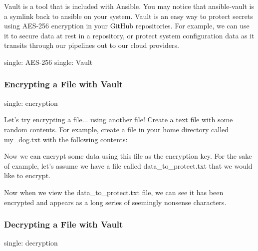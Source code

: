 Vault is a tool that is included with Ansible. You may notice that
ansible-vault is a symlink back to ansible on your system. Vault is an
easy way to protect secrets using AES-256 encryption in your GitHub
repositories. For example, we can use it to secure data at rest in a
repository, or protect system configuration data as it transits through
our pipelines out to our cloud providers.

single: AES-256 single: Vault

\hypertarget{encrypting-a-file-with-vault}{%
   \subsubsection{Encrypting a File with
      Vault}\label{encrypting-a-file-with-vault}}

single: encryption

Let's try encrypting a file... using another file! Create a text file
with some random contents. For example, create a file in your home
directory called my\_dog.txt with the following contents:

\begin{Shaded}
   \begin{Highlighting}[]
   \end{Highlighting}
\end{Shaded}

Now we can encrypt some data using this file as the encryption key. For
the sake of example, let's assume we have a file called
data\_to\_protect.txt that we would like to encrypt.

\begin{Shaded}
   \begin{Highlighting}[]
   \end{Highlighting}
\end{Shaded}

Now when we view the data\_to\_protect.txt file, we can see it has been
encrypted and appears as a long series of seemingly nonsense characters.

\hypertarget{decrypting-a-file-with-vault}{%
   \subsubsection{Decrypting a File with
      Vault}\label{decrypting-a-file-with-vault}}

single: decryption

